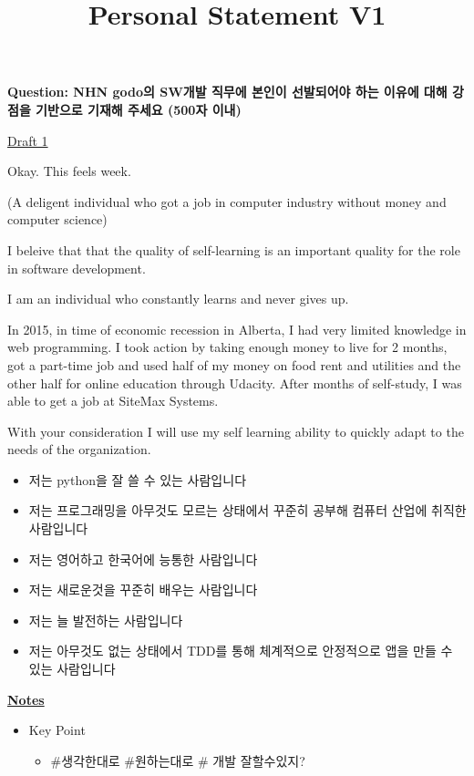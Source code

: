 \documentclass[12pt]{article}
\begin{document}
\title{Personal Statement V1}
\maketitle

\textbf{Question: NHN godo의 SW개발 직무에 본인이 선발되어야 하는 이유에 대해 강점을 기반으로 기재해 주세요 (500자 이내)}

\bigskip

\underline{Draft 1}

Okay. This feels week.

\bigskip

(A deligent individual who got a job in computer industry without money and computer science)

I beleive that that the quality of self-learning is an important quality for the role in software development.

\bigskip

I am an individual who constantly learns and never gives up.

\bigskip

In 2015, in time of economic recession in Alberta, I had very limited knowledge in
web programming. I took action by taking enough money to live for 2 months, got a part-time job
and used half of my money on food rent and utilities and the other half for online education
through Udacity. After months of self-study, I was able to get a job at SiteMax Systems.

\bigskip

With your consideration I will use my self learning ability to quickly adapt to the needs
of the organization.


\begin{itemize}
    \item 저는 python을 잘 쓸 수 있는 사람입니다
    \item 저는 프로그래밍을 아무것도 모르는 상태에서 꾸준히 공부해 컴퓨터 산업에 취직한 사람입니다
    \item 저는 영어하고 한국어에 능통한 사람입니다
    \item 저는 새로운것을 꾸준히 배우는 사람입니다
    \item 저는 늘 발전하는 사람입니다
    \item 저는 아무것도 없는 상태에서 TDD를 통해 체계적으로 안정적으로 앱을 만들 수 있는 사람입니다
\end{itemize}

\bigskip

\underline{\textbf{Notes}}

\begin{itemize}
    \item Key Point
    \begin{itemize}
        \item \#생각한대로 \#원하는대로 \# 개발 잘할수있지?
    \end{itemize}
\end{itemize}
\end{document}
